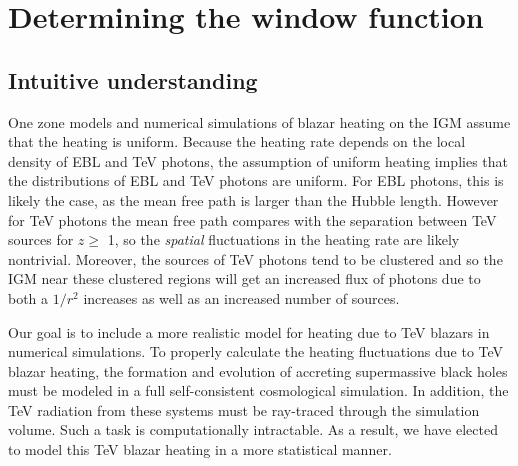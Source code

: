 \documentclass[twocolumns]{emulateapj}
\begin{document}













\section {Determining the window function}\label{window}
\subsection{Intuitive understanding}
One zone models \citep{2012ApJ...752...23C,2012ApJ...752...24P} and numerical simulations  \citep{2012MNRAS.423..149P} of blazar heating on the IGM assume that the heating is uniform.  Because the heating rate depends on the local density of EBL and TeV photons, the assumption of uniform heating implies that the distributions of EBL and TeV photons are uniform.  For EBL photons, this is likely the case, as the mean free path is larger than the Hubble length. However for TeV photons the mean free path compares with the separation between TeV sources for $z\geqslant$ 1, so the {\it spatial} fluctuations in the heating rate are likely nontrivial. Moreover, the sources of TeV photons tend to be clustered and so the IGM near these clustered regions will get an increased flux of photons due to both a $1/r^2$ increases as well as an increased number of sources.



Our goal is to include a more realistic model for heating due to TeV blazars in numerical simulations.
To properly calculate the heating fluctuations due to TeV blazar heating, the formation and evolution of accreting supermassive black holes must be modeled in a full self-consistent cosmological simulation.  In addition, the TeV radiation from these systems must be ray-traced through the simulation volume.  Such a task is computationally intractable.  As a result, we have elected to model this TeV blazar heating in a more statistical manner.  
\end{document}
